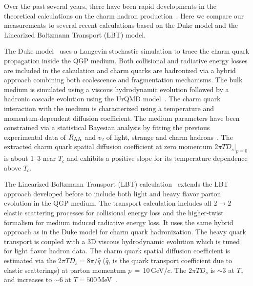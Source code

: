 \documentclass[%
 reprint,	
 amsmath,amssymb,
 aps,
 prc,
]{revtex4-1}
\begin{document}
Over the past several years, there have been rapid developments in the theoretical calculations on the charm hadron production~\cite{Rapp:2018qla,Cao:2018ews}. Here we compare our measurements to several recent calculations based on the Duke model and the Linearized Boltzmann Transport (LBT) model.

The Duke model~\cite{Duke,Xu:2017obm} uses a Langevin stochastic simulation to trace the charm quark propagation inside the QGP medium. Both collisional and radiative energy losses are included in the calculation and charm quarks are hadronized via a hybrid approach combining both coalescence and fragmentation mechanisms. The bulk medium is simulated using a viscous hydrodynamic evolution followed by a hadronic cascade evolution using the UrQMD model~\cite{urQMD}. The charm quark interaction with the medium is characterized using a temperature and momentum-dependent diffusion coefficient. The medium parameters have been constrained via a statistical Bayesian analysis by fitting the previous experimental data of $R_{\rm AA}$ and $v_{2}$ of light, strange and charm hadrons~\cite{Xu:2017obm}. The extracted charm quark spatial diffusion coefficient at zero momentum $2\pi TD_s|_{p=0}$ is about 1--3 near $T_{c}$ and exhibits a positive slope for its temperature dependence above $T_{c}$.

The Linearized Boltzmann Transport (LBT) calculation~\cite{Cao:2016gvr} extends the LBT approach developed before to include both light and heavy flavor parton evolution in the QGP medium. The transport calculation includes all $2\rightarrow 2$ elastic scattering processes for collisional energy loss and the higher-twist formalism for medium induced radiative energy loss. It uses the same hybrid approach as in the Duke model for charm quark hadronization. The heavy quark transport is coupled with a 3D viscous hydrodynamic evolution which is tuned for light flavor hadron data. The charm quark spatial diffusion coefficient is estimated via the $2\pi TD_s =8\pi/\hat{q}$ ($\hat{q}$, is the quark transport coefficient due to elastic scatterings) at parton momentum $p$\,$=$\,10\,GeV/$c$. The $2\pi TD_s$ is $\sim$3 at $T_{c}$ and increases to $\sim$6 at $T = 500$\,MeV~\cite{LBT:private}.
\end{document}
